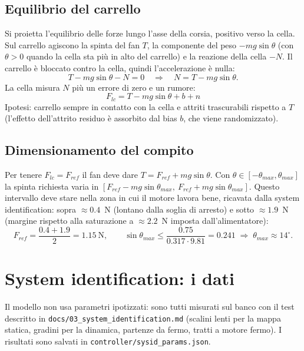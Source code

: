 \documentclass[11pt,a4paper]{article}
\newcommand{\code}[1]{\texttt{\small #1}}
\begin{document}
\subsection{Equilibrio del carrello}
Si proietta l'equilibrio delle forze lungo l'asse della corsia, positivo verso la cella.
Sul carrello agiscono la spinta del fan $T$, la componente del peso $-mg\sin\theta$
(con $\theta>0$ quando la cella sta più in alto del carrello) e la reazione della cella $-N$.
Il carrello è bloccato contro la cella, quindi l'accelerazione è nulla:
\begin{equation}
T - m g \sin\theta - N = 0 \quad\Rightarrow\quad N = T - m g\sin\theta .
\end{equation}
La cella misura $N$ più un errore di zero e un rumore:
\begin{equation}
\boxed{F_{lc} = T - m g \sin\theta + b + n}
\label{eq:misura}
\end{equation}
Ipotesi: carrello sempre in contatto con la cella e attriti trascurabili rispetto a $T$
(l'effetto dell'attrito residuo è assorbito dal bias $b$, che viene randomizzato).

\subsection{Dimensionamento del compito}
Per tenere $F_{lc}=F_{ref}$ il fan deve dare $T = F_{ref} + mg\sin\theta$. Con $\theta\in[-\theta_{max},\theta_{max}]$
la spinta richiesta varia in $[F_{ref} - mg\sin\theta_{max},\ F_{ref} + mg\sin\theta_{max}]$.
Questo intervallo deve stare nella zona in cui il motore lavora bene, ricavata dalla system
identification: sopra $\approx0.4$~N (lontano dalla soglia di arresto) e sotto $\approx1.9$~N
(margine rispetto alla saturazione a $\approx2.2$~N imposta dall'alimentatore):
\begin{equation}
F_{ref} = \frac{0.4 + 1.9}{2} = 1.15\ \text{N},\qquad
\sin\theta_{max} \le \frac{0.75}{0.317\cdot 9.81} = 0.241 \;\Rightarrow\; \theta_{max} \approx 14^\circ .
\end{equation}

\section{System identification: i dati}

Il modello non usa parametri ipotizzati: sono tutti misurati sul banco con il test descritto in
\code{docs/03\_system\_identification.md} (scalini lenti per la mappa statica, gradini per la dinamica,
partenze da fermo, tratti a motore fermo). I risultati sono salvati in \code{controller/sysid\_params.json}.
\end{document}
